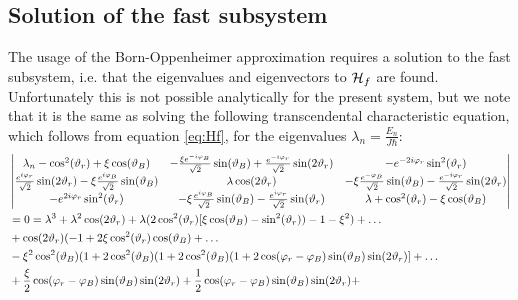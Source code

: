 \documentclass[a4paper]{article}
\begin{document}
\subsection{Solution of the fast subsystem} %
The usage of the Born-Oppenheimer approximation requires a solution to the fast subsystem,
i.e. that the eigenvalues and eigenvectors to \(\mathbb{\cal H}_f\) are found.
Unfortunately this is not possible analytically for the present system, but we note that it
is the same as solving the following transcendental characteristic equation, which follows
from equation \ref{eq:Hf}, for the
eigenvalues \(\lambda_n = \frac{E_n}{J\hbar{}}\): %
\begin{align}
         & \mdet{
                \lambda_n - \cos[2](\vartheta_r) + \xi \cos(\vartheta_B) & -\frac{\xi
                e^{-i\varphi_B}}{\sqrt{2} }\sin(\vartheta_B) +
                        \frac{e^{-i\varphi_r}}{\sqrt{2} }\sin(2\vartheta_r) &
                        -e^{-2i\varphi_r}\sin[2](\vartheta_r)\\
                        \frac{e^{i\varphi_r}}{\sqrt{2}}\sin(2\vartheta_r) - \xi
                        \frac{e^{i\varphi_B}}{\sqrt{2} }\sin(\vartheta_B) & \lambda
                        \cos(2\vartheta_r) & -\xi \frac{e^{-\varphi_B}}{\sqrt{2}
                        }\sin(\vartheta_B)-\frac{e^{-i\varphi_r}}{\sqrt{2}
                }\sin(2\vartheta_r)\\
                -e^{2i\varphi_r}\sin[2](\vartheta_r) & -\xi \frac{e^{i\varphi_B}}{\sqrt{2}
                }\sin(\vartheta_B) - \frac{e^{i\varphi_r}}{\sqrt{2}}\sin(\vartheta_r) &
                \lambda + \cos[2](\vartheta_r) - \xi\cos(\vartheta_B)}\nonumber\\
                &= 0 = \lambda^3 + \lambda^2\cos(2\vartheta_r) +
                \lambda(2\cos[2](\vartheta_r)[\xi\cos(\vartheta_B)-\sin[2](\vartheta_r))-1-\xi^2)
                +\dots\nonumber\\
                &+\cos(2\vartheta_r)(-1 +
                2\xi\cos[2](\vartheta_r)\cos(\vartheta_B)+\dots\nonumber\\
                &-\xi^2\cos[2](\vartheta_B)(1+2\cos[2](\vartheta_B)(1+2\cos[2](\vartheta_B)(1+2\cos(\varphi_r-\varphi_B)\sin(\vartheta_B)\sin(2\vartheta_r)]+\dots\nonumber\\
                &+
                \frac{\xi}{2}\cos(\varphi_r-\varphi_B)\sin(\vartheta_B)\sin(2\vartheta_r) +
                \frac{1}{2}\cos(\varphi_r-\varphi_B)\sin(\vartheta_B)\sin(2\vartheta_r) +

\end{align}
\end{document}
